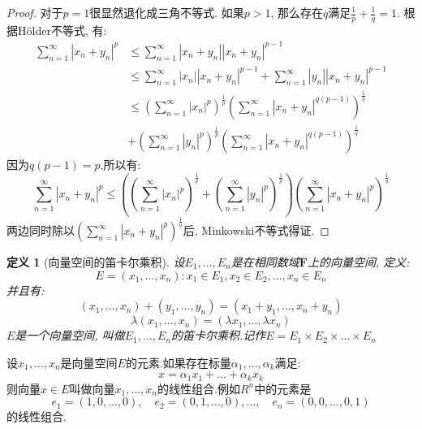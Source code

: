 \documentclass{book}
\newtheorem{definition}{\hspace{2em}定义}[section]
\newtheorem{proof}{证明}[section]
\begin{document}
\begin{proof}
  对于$p=1$很显然退化成三角不等式. 如果$p>1$, 那么存在$q$满足$\frac{1}{p}+\frac{1}{q}=1$. 根据H\"{o}lder不等式, 有:
  \begin{equation*}
  \begin{split}
     \sum_{n=1}^{\infty}|x_n+y_n|^p&\leq\sum_{n=1}^{\infty}|x_n+y_n||x_n+y_n|^{p-1}\\
       &\leq\sum_{n=1}^{\infty}|x_n||x_n+y_n|^{p-1}+\sum_{n=1}^{\infty}|y_n||x_n+y_n|^{p-1}\\
       &\leq(\sum_{n=1}^{\infty}|x_n|^p)^\frac{1}{p}(\sum_{n=1}^{\infty}|x_n+y_n|^{q(p-1)})^\frac{1}{q}\\
       &+(\sum_{n=1}^{\infty}|y_n|^p)^\frac{1}{p}(\sum_{n=1}^{\infty}|x_n+y_n|^{q(p-1)})^\frac{1}{q}
  \end{split}
  \end{equation*}
  因为$q(p-1)=p$,所以有:
  \begin{equation*}
    \sum_{n=1}^{\infty}|x_n+y_n|^p\leq ((\sum_{n=1}^{\infty}|x_n|^p)^\frac{1}{p}+(\sum_{n=1}^{\infty}|y_n|^p)^\frac{1}{p})(\sum_{n=1}^{\infty}|x_n+y_n|^{p})^\frac{1}{q}
  \end{equation*}
  两边同时除以$(\sum_{n=1}^{\infty}|x_n+y_n|^p)^{\frac{1}{q}}$后, Minkowski不等式得证.
\end{proof}
\begin{definition}[向量空间的笛卡尔乘积]
  设$E_1,\dots,E_n$是在相同数域$\mathbf{F}$上的向量空间, 定义:
  \begin{equation*}
    E={(x_1,\dots,x_n):x_1\in E_1,x_2\in E_2,\dots,x_n\in E_n}
  \end{equation*}
  并且有:
  \begin{equation*}
    (x_1,\dots,x_n)+(y_1,\dots,y_n)=(x_1+y_1,\dots,x_n+y_n)
  \end{equation*}
  \begin{equation*}
    \lambda(x_1,\dots,x_n)=(\lambda x_1,\dots,\lambda x_n)
  \end{equation*}
  $E$是一个向量空间, 叫做$E_1,\dots,E_n$的笛卡尔乘积.记作$E=E_1\times E_2\times\dots\times E_n$
\end{definition}
设$x_1,\dots,x_n$是向量空间$E$的元素.如果存在标量$\alpha_1,\dots,\alpha_k$满足:
\begin{equation*}
  x=\alpha_1x_1+\dots+\alpha_kx_k
\end{equation*}
则向量$x\in E$叫做向量$x_1,\dots,x_n$的线性组合.例如$R^n$中的元素是
\begin{equation*}
  e_1=(1,0,\dots,0),\quad e_2=(0,1,\dots,0),\dots,\quad e_n=(0,0,\dots,0,1)
\end{equation*}
的线性组合.
\end{document}
